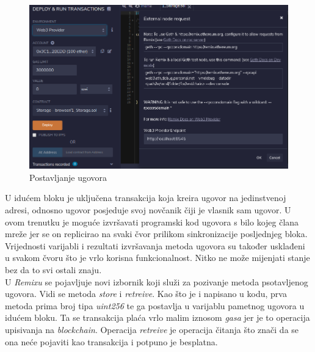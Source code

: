 \documentclass[times, utf8, zavrsni]{fer}
\begin{document}
\begin{figure}[ht]
  \includegraphics[width=\textwidth]{remixconnect.png}
  \caption{Postavljanje ugovora}
  \centering
  \vfill
\end{figure}

U idućem bloku je uključena transakcija koja kreira ugovor na jedinstvenoj adresi, odnosno ugovor posjeduje svoj novčanik čiji je vlasnik sam ugovor. 
U ovom trenutku je moguće izvršavati programski kod ugovora s bilo kojeg člana mreže jer se on replicirao na svaki čvor prilikom sinkronizacije posljednjeg bloka.
Vrijednosti varijabli i rezultati izvršavanja metoda ugovora su također usklađeni u svakom čvoru što je vrlo korisna funkcionalnost. Nitko ne može mijenjati stanje
bez da to svi ostali znaju. \\
U \emph{Remixu} se pojavljuje novi izbornik koji služi za pozivanje metoda psotavljenog ugovora. Vidi se metoda \emph{store} i \emph{retreive}. Kao što je i napisano
u kodu, prva metoda prima broj tipa \emph{uint256} te ga postavlja u varijablu pametnog ugovora u idućem bloku. Ta se transakcija plaća vrlo malim iznosom \emph{gasa}
jer je to operacija upisivanja na \emph{blockchain}. Operacija \emph{retreive} je operacija čitanja što znači da se ona neće pojaviti kao transakcija i potpuno je 
besplatna. 

\pagebreak
\end{document}
